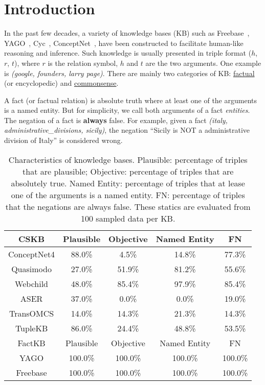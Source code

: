 \section{Introduction}
\label{sec:intro}


In the past few decades, a variety of knowledge bases (KB) such as Freebase~\cite{bollacker2008freebase}, 
YAGO~\cite{suchanek2007yago}, Cyc~\cite{lenat1995cyc}, ConceptNet~\cite{speer2017conceptnet}, have been constructed to facilitate human-like
reasoning and inference. Such knowledge is usually presented in
triple format ($h$, $r$, $t$), where $r$ is the relation symbol, 
$h$ and $t$ are the two arguments. One example is 
\textit{(google, founders, larry page)}. There are mainly two categories of KB: \uline{factual} (or encyclopedic) and 
\uline{commonsense}. 

A fact (or factual relation) is absolute truth where at least one of the
arguments is a named entity. But for simplicity, we call both arguments
of a fact \textit{entities}. 
The negation of a fact is \textbf{always} false. 
For example, given a fact \textit{(italy, administrative\_divisions, sicily)}, 
the negation ``Sicily is NOT a administrative division of Italy'' is considered
wrong.  


\begin{table}[th]
	\scriptsize
	\centering
	\begin{tabular}{ccccc}
		\toprule
		CSKB & Plausible & Objective&Named Entity&FN\\ \hline
		ConceptNet4 &88.0\% &4.5\%  &14.8\%  &77.3\%  \\
		Quasimodo &27.0\% &51.9\%  &81.2\%  &55.6\%  \\
		Webchild &48.0\% &85.4\% & 97.9\% &85.4\% \\
		ASER &37.0\% &0.0\% & 0.0\% & 19.0\% \\
		TransOMCS&14.0\% &14.3\%&21.3\%&14.3\% \\
		TupleKB &86.0\% &24.4\%  &48.8\%  &53.5\%  \\ \hline
		FactKB & Plausible & Objective& Named Entity&FN  \\ \hline
		
		 YAGO&100.0\% &100.0\%&100.0\%  &100.0\%  \\
		 Freebase & 100.0\% & 100.0\% &100.0\% &100.0\% \\
		
		 
		\bottomrule
	\end{tabular}
	\caption{ Characteristics of knowledge bases. Plausible: percentage of triples that are plausible; Objective: percentage of triples that are absolutely true. Named Entity: percentage of triples that at lease one of the arguments is a named entity. FN: percentage of triples that the negations are always false. These statics are evaluated from 100 sampled data per KB.}
	\label{table:properties}
\end{table}


